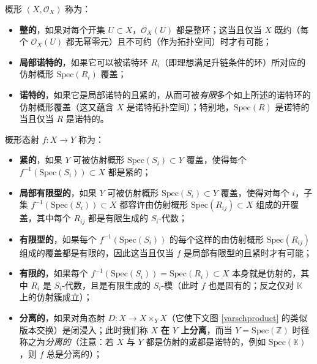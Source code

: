 \begin{Def}
概形 $(X,\mathcal{O}_X)$ 称为：
\begin{itemize}[leftmargin=0.5cm]
	\item \textbf{整的}，如果对每个开集 $U\subset X$，$\mathcal{O}_X(U)$ 都是整环；这当且仅当 $X$ 既约（每个 $\mathcal{O}_X(U)$ 都无幂零元）且不可约（作为拓扑空间）时才有可能；
	
	\item \textbf{局部诺特的}，如果它可以被诺特环 $R_i$（即理想满足升链条件的环）所对应的仿射概形 $\text{Spec}(R_i)$ 覆盖；
	
	\item \textbf{诺特的}，如果它是局部诺特的且紧的，从而可被\textit{有限}多个如上所述的诺特环的仿射概形覆盖（这又蕴含 $X$ 是诺特拓扑空间）；特别地，$\text{Spec}(R)$ 是诺特的当且仅当 $R$ 是诺特的。		
\end{itemize}
\noindent 概形态射 $f:X\rightarrow Y$ 称为：
\begin{itemize}[leftmargin=0.5cm]
	\item \textbf{紧的}，如果 $Y$ 可被仿射概形 $\text{Spec}(S_i)\subset Y$ 覆盖，使得每个 $f^{-1}(\text{Spec}(S_i))\subset X$ 都是紧的； 
	
	\item \textbf{局部有限型的}，如果 $Y$ 可被仿射概形 $\text{Spec}(S_i)\subset Y$ 覆盖，使得对每个 $i$，子集 $f^{-1}(\text{Spec}(S_i))\subset X$ 都容许由仿射概形 $\text{Spec}(R_{ij})\subset X$ 组成的开覆盖，其中每个 $R_{ij}$ 都是有限生成的 $S_i$-代数；
	
	\item \textbf{有限型的}，如果每个 $f^{-1}(\text{Spec}(S_i))$ 的每个这样的由仿射概形 $\text{Spec}(R_{ij})$ 组成的覆盖都是有限的，因此这当且仅当 $f$ 是局部有限型的且紧时才有可能；
	
	\item \textbf{有限的}，如果每个 $f^{-1}(\text{Spec}(S_i))=\text{Spec}(R_i)\subset X$ 本身就是仿射的，其中 $R_i$ 是 $S_i$-代数，且是有限生成的 $S_i$-模（此时 $f$ 也是固有的；反之仅对 $\mathbb{K}$ 上的仿射簇成立）；
	
	\item \textbf{分离的}，如果对角态射 $D:X\rightarrow X\times_Y X$（它使下文图 \eqref{varschproduct} 的类似版本交换）是闭浸入；此时我们称 $X$ \textbf{在 $Y$ 上分离}，而当 $Y=\text{Spec}(\mathbb{Z})$ 时径称之为\textit{分离的}（注意：若 $X$ 与 $Y$ 都是仿射的或都是诺特的，例如 $\text{Spec}(\mathbb{K})$，则 $f$ 总是分离的）； 
	

\end{itemize}
\end{Def}
